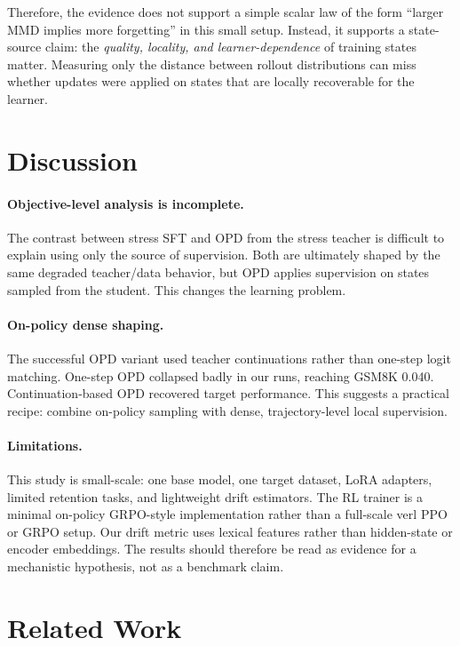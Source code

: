 \documentclass{article}
\begin{document}
Therefore, the evidence does not support a simple scalar law of the form
``larger MMD implies more forgetting'' in this small setup. Instead, it supports
a state-source claim: the \emph{quality, locality, and learner-dependence} of
training states matter. Measuring only the distance between rollout
distributions can miss whether updates were applied on states that are locally
recoverable for the learner.

\section{Discussion}

\paragraph{Objective-level analysis is incomplete.}
The contrast between stress SFT and OPD from the stress teacher is difficult to
explain using only the source of supervision. Both are ultimately shaped by the
same degraded teacher/data behavior, but OPD applies supervision on states
sampled from the student. This changes the learning problem.

\paragraph{On-policy dense shaping.}
The successful OPD variant used teacher continuations rather than one-step
logit matching. One-step OPD collapsed badly in our runs, reaching GSM8K 0.040.
Continuation-based OPD recovered target performance. This suggests a practical
recipe: combine on-policy sampling with dense, trajectory-level local
supervision.

\paragraph{Limitations.}
This study is small-scale: one base model, one target dataset, LoRA adapters,
limited retention tasks, and lightweight drift estimators. The RL trainer is a
minimal on-policy GRPO-style implementation rather than a full-scale verl PPO or
GRPO setup. Our drift metric uses lexical features rather than hidden-state or
encoder embeddings. The results should therefore be read as evidence for a
mechanistic hypothesis, not as a benchmark claim.

\section{Related Work}
\end{document}
